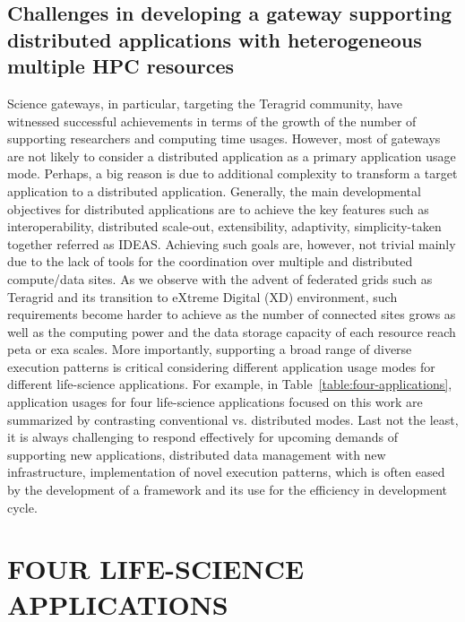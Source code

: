 \documentclass{sig-alternate}
\begin{document}
\subsection{Challenges in developing a gateway supporting distributed applications with heterogeneous multiple HPC resources}

Science gateways, in particular, targeting the Teragrid community, have witnessed successful achievements in terms of the growth of the number of supporting researchers and computing time usages.  However, most of gateways are not likely to consider a distributed application as a primary application usage mode.  Perhaps, a big reason is due to additional complexity to transform a target application to a distributed application.  Generally, the main developmental objectives for distributed applications are to achieve the key features such as interoperability, distributed scale-out, extensibility, adaptivity, simplicity-taken together referred as IDEAS\cite{ideas}.  Achieving such goals are, however, not trivial mainly due to the lack of tools for the coordination over multiple and distributed compute/data sites.  As we observe with the advent of federated grids such as Teragrid and its transition to eXtreme Digital (XD) environment, such requirements become harder to achieve as the number of connected sites grows as well as the computing power and the data storage capacity of each resource reach peta or exa scales.   More importantly, supporting a broad range of diverse execution patterns is critical considering different application usage modes for different life-science applications.  For example, in Table~\ref{table:four-applications}, application usages for four life-science applications focused on this work are summarized by contrasting conventional vs. distributed modes.  Last not the least, it is always challenging to respond effectively for upcoming demands of supporting new applications, distributed data management with new infrastructure, implementation of novel execution patterns, which is often eased by the development of a framework and its use for the efficiency in development cycle.   



\section{FOUR LIFE-SCIENCE APPLICATIONS}
\end{document}
